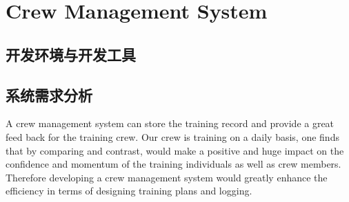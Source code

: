 \chapter{Crew Management System}

\section{开发环境与开发工具}

\section{系统需求分析}%


A crew management system can store the training record and provide a great feed
back for the training crew. Our crew is training on a daily basis, one finds
that by comparing and contrast, would make a positive and huge impact on the
confidence and momentum of the training individuals as well as crew members.
Therefore developing a crew management system would greatly enhance the efficiency
in terms of designing training plans and logging.

